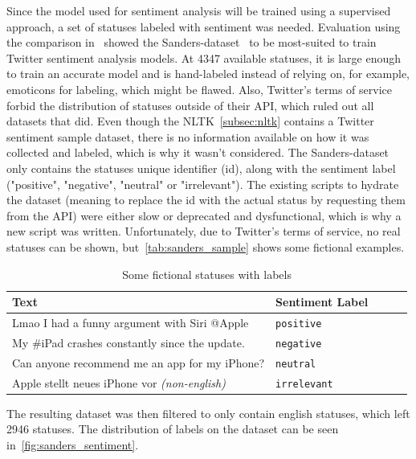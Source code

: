 Since the model used for sentiment analysis will be trained using a supervised approach,
a set of statuses labeled with sentiment was needed.
Evaluation using the comparison in~\cite{Saif2013} showed the Sanders-dataset~\cite{sanders} to be most-suited to train Twitter sentiment analysis models.
At 4347 available statuses, it is large enough to train an accurate model and is hand-labeled instead of relying on, for example, emoticons for labeling, which might be flawed.
Also, Twitter's terms of service forbid the distribution of statuses outside of their API, which ruled out all datasets that did.
Even though the NLTK~\autoref{subsec:nltk} contains a Twitter sentiment sample dataset,
there is no information available on how it was collected and labeled, which is why it wasn't considered.
The Sanders-dataset only contains the statuses unique identifier (id), along with the sentiment label ("positive", "negative", "neutral" or "irrelevant").
The existing scripts to hydrate the dataset (meaning to replace the id with the actual status by requesting them from the API) were either slow or deprecated and dysfunctional,
which is why a new script was written.
Unfortunately, due to Twitter's terms of service, no real statuses can be shown, but~\autoref{tab:sanders_sample} shows some fictional examples.

\begin{table}
    \caption{Some fictional statuses with labels}
    \label{tab:sanders_sample}
    \centering
    \begin{tabular}{lllll} %
        \toprule
        Text
        & Sentiment Label
        \\
        \midrule
        Lmao I had a funny argument with Siri @Apple
        & \texttt{positive}
        \\
        My \#iPad crashes constantly since the update.
        & \texttt{negative}
        \\
        Can anyone recommend me an app for my iPhone?
        & \texttt{neutral}
        \\
        Apple stellt neues iPhone vor \textit{(non-english)}
        & \texttt{irrelevant}
        \\
        \bottomrule
    \end{tabular}
\end{table}

The resulting dataset was then filtered to only contain english statuses, which left 2946 statuses.
The distribution of labels on the dataset can be seen in~\autoref{fig:sanders_sentiment}.

